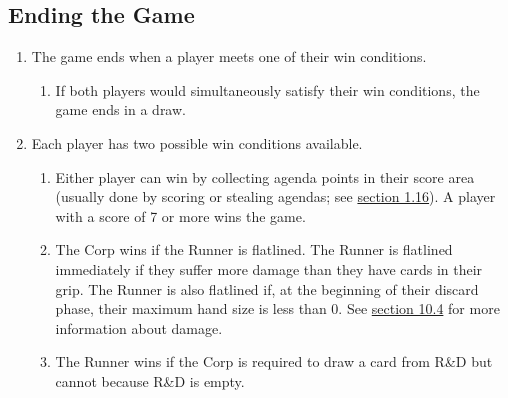 \subsection{Ending the Game}
\begin{enumerate}
	\item The game ends when a player meets one of their win conditions.
	      \begin{enumerate}
		      \item If both players would simultaneously satisfy their win conditions, the game ends in a draw.
	      \end{enumerate}
	\item Each player has two possible win conditions available.
	      \begin{enumerate}
		      \item Either player can win by collecting agenda points in their score area (usually done by scoring or stealing agendas; see \hyperlink{page.i}{section 1.16}). A player with a score of 7 or more wins the game.
		      \item The Corp wins if the Runner is flatlined. The Runner is flatlined immediately if they suffer more damage than they have cards in their grip. The Runner is also flatlined if, at the beginning of their discard phase, their maximum hand size is less than 0. See \hyperlink{page.i}{section 10.4} for more information about damage.
		      \item The Runner wins if the Corp is required to draw a card from R\&D but cannot because R\&D is empty.
	      \end{enumerate}
\end{enumerate}

